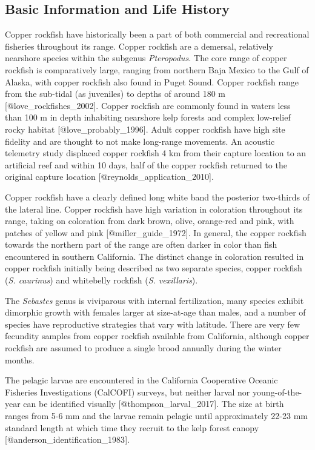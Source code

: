 \documentclass[11pt,
  letterpaper,
]{article}
\begin{document}
\subsection{Basic Information and Life History}\label{basic-information-and-life-history}

Copper rockfish have historically been a part of both commercial and recreational fisheries throughout its range. Copper rockfish are a demersal, relatively nearshore species within the subgenus \emph{Pteropodus.} The core range of copper rockfish is comparatively large, ranging from northern Baja Mexico to the Gulf of Alaska, with copper rockfish also found in Puget Sound. Copper rockfish range from the sub-tidal (as juveniles) to depths of around 180 m {[}@love\_rockfishes\_2002{]}. Copper rockfish are commonly found in waters less than 100 m in depth inhabiting nearshore kelp forests and complex low-relief rocky habitat {[}@love\_probably\_1996{]}. Adult copper rockfish have high site fidelity and are thought to not make long-range movements. An acoustic telemetry study displaced copper rockfish 4 km from their capture location to an artificial reef and within 10 days, half of the copper rockfish returned to the original capture location {[}@reynolds\_application\_2010{]}.

Copper rockfish have a clearly defined long white band the posterior two-thirds of the lateral line. Copper rockfish have high variation in coloration throughout its range, taking on coloration from dark brown, olive, orange-red and pink, with patches of yellow and pink {[}@miller\_guide\_1972{]}. In general, the copper rockfish towards the northern part of the range are often darker in color than fish encountered in southern California. The distinct change in coloration resulted in copper rockfish initially being described as two separate species, copper rockfish (\emph{S. caurinus}) and whitebelly rockfish (\emph{S. vexillaris}).

The \emph{Sebastes} genus is viviparous with internal fertilization, many species exhibit dimorphic growth with females larger at size-at-age than males, and a number of species have reproductive strategies that vary with latitude. There are very few fecundity samples from copper rockfish available from California, although copper rockfish are assumed to produce a single brood annually during the winter months.

The pelagic larvae are encountered in the California Cooperative Oceanic Fisheries Investigations (CalCOFI) surveys, but neither larval nor young-of-the-year can be identified visually {[}@thompson\_larval\_2017{]}. The size at birth ranges from 5-6 mm and the larvae remain pelagic until approximately 22-23 mm standard length at which time they recruit to the kelp forest canopy {[}@anderson\_identification\_1983{]}.
\end{document}
